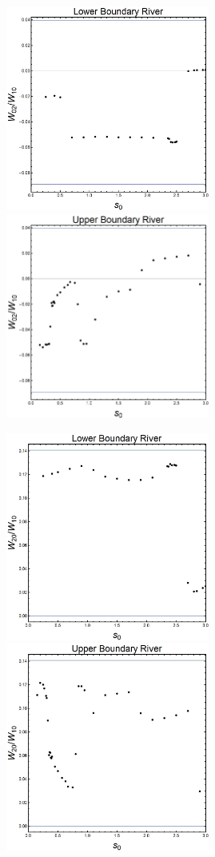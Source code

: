 ﻿\documentclass[12pt,a4paper]{article}
\begin{document}
\begin{figure}[H]
    \centering
   {{\includegraphics[width=6.7cm]{L02.jpg} }}
  {{\includegraphics[width=6.7cm]{U02.jpg} }}
\end{figure}

\begin{figure}[H]
    \centering
   {{\includegraphics[width=6.7cm]{L20.jpg} }}
  {{\includegraphics[width=6.7cm]{U20.jpg} }}
\end{figure}
\end{document}
